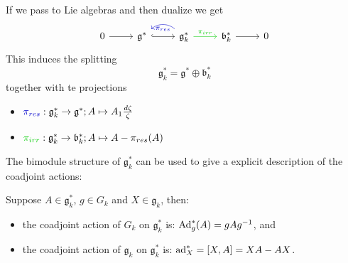 \begin{frame}[fragile]
  If we pass to Lie algebras and then dualize we get
  \[ \begin{tikzcd}[row sep=0]
  0 \rar & \mathfrak{g}^* \arrow[hook]{r}
         & \mathfrak{g}_k^* \rar[green!80!black]{\pi_{irr}}
                            \arrow[bend right=40,blue!80!black]{l}{\pi_{res}}
         & \mathfrak{b}_k^* \rar
         & 0
  \end{tikzcd} \]
  This induces the splitting
  \[
    \mathfrak{g}_k^*= \mathfrak{g}^*\oplus \mathfrak{b}_k^*
  \]
  together with te projections
  \begin{itemize}
    \item $\textcolor{blue!80!black}{\pi_{res}}:
      \mathfrak{g}_k^*\to\mathfrak{g}^*; A \mapsto A_1\frac{d\zeta}{\zeta}$
    \item $\textcolor{green!80!black}{\pi_{irr}}:
      \mathfrak{g}_k^*\to\mathfrak{b}_k^*; A\mapsto A-\pi_{res}(A)$
  \end{itemize}
  The bimodule structure of $\mathfrak{g}_k^*$ can be used to give a explicit
  description of the coadjoint actions:
  \begin{lem}
    Suppose $A\in\mathfrak{g}_k^*$, $g\in G_k$ and $X\in\mathfrak{g}_k$, then:
    \begin{itemize}
      \item the coadjoint action of $G_k$ on $\mathfrak{g}_k^*$ is:
      $\operatorname{Ad}_g^*(A)=gAg^{-1}$, and
      \item the coadjoint action of $\mathfrak{g}_k$ on $\mathfrak{g}_k^*$ is:
      $\operatorname{ad}_X^*=[X,A]=XA-AX$.
    \end{itemize}
  \end{lem}
\end{frame}


